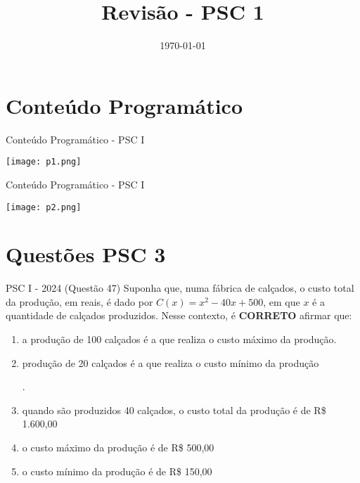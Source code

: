 \documentclass[aspectratio=169]{beamer}
\title[CETi Gilberto Mestrinho]{Revisão - PSC 1}
\date{\today}
\newif\ifusarcorvermelha
\newcommand{\vermelho}[1]{%
    \ifusarcorvermelha
        {\color{red}#1}%
    \else
        #1%
    \fi
}
\begin{document}
\justifying
\onehalfspacing


\begin{frame}
    \titlepage
\end{frame}

\section{Conteúdo Programático}

\begin{frame}{Conteúdo Programático - PSC I}

    \begin{center}
        \texttt{[image: p1.png]}
    \end{center}
    
\end{frame}

\begin{frame}{Conteúdo Programático - PSC I}

    \begin{center}
        \texttt{[image: p2.png]}
    \end{center}
    
\end{frame}

\section{Questões PSC 3}

    \begin{frame}{PSC I - 2024 (Questão 47)}
        Suponha que, numa fábrica de calçados, o custo total da produção, em reais, é dado por $C(x) = x^{2}-40x+500$, em que $x$ é a quantidade de calçados produzidos. Nesse contexto, é \textbf{CORRETO} afirmar que:

            \begin{enumerate}[a]
                \item a produção de 100 calçados é a que realiza o custo máximo da produção.
                \item \vermelho{produção de 20 calçados é a que realiza o custo mínimo da produção}.  %
                \item quando são produzidos 40 calçados, o custo total da produção é de R\$ 1.600,00
                \item o custo máximo da produção é de R\$ 500,00
                \item o custo mínimo da produção é de R\$ 150,00
            \end{enumerate}
            
    \end{frame}
\end{document}
